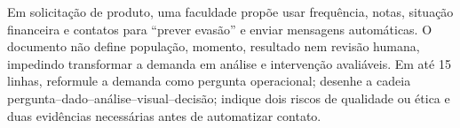 \documentclass[12pt,a4paper]{article}
\begin{document}
\TextoBase Em solicitação de produto, uma faculdade propõe usar frequência, notas, situação financeira e contatos para ``prever evasão'' e enviar mensagens automáticas. O documento não define população, momento, resultado nem revisão humana, impedindo transformar a demanda em análise e intervenção avaliáveis.
\FonteDidatica
\Comando Em até 15 linhas, reformule a demanda como pergunta operacional; desenhe a cadeia pergunta--dado--análise--visual--decisão; indique dois riscos de qualidade ou ética e duas evidências necessárias antes de automatizar contato.
\EspacoDiscursiva
\end{document}
